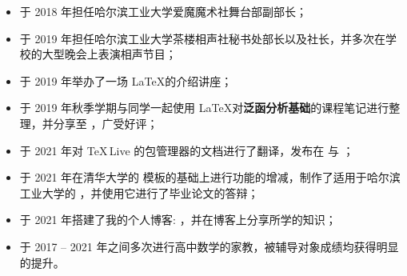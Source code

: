 \documentclass[zh]{resume}
\begin{document}
\begin{itemize}
  \item 于 2018 年担任哈尔滨工业大学爱魔魔术社舞台部副部长；
  \item 于 2019 年担任哈尔滨工业大学茶楼相声社秘书处部长以及社长，并多次在学校的大型晚会上表演相声节目；
  \item 于 2019 年举办了一场 \LaTeX 的介绍讲座；
  \item 于 2019 年秋季学期与同学一起使用 \LaTeX 对\textbf{泛函分析基础}的课程笔记进行整理，并分享至 ，广受好评；
  \item 于 2021 年对 \TeX\,Live 的包管理器的文档进行了翻译，发布在  与 ；
  \item 于 2021 年在清华大学的  模板的基础上进行功能的增减，制作了适用于哈尔滨工业大学的 ，并使用它进行了毕业论文的答辩；
  \item 于 2021 年搭建了我的个人博客: ，并在博客上分享所学的知识；
  \item 于 2017 -- 2021 年之间多次进行高中数学的家教，被辅导对象成绩均获得明显的提升。
\end{itemize}
\end{document}
